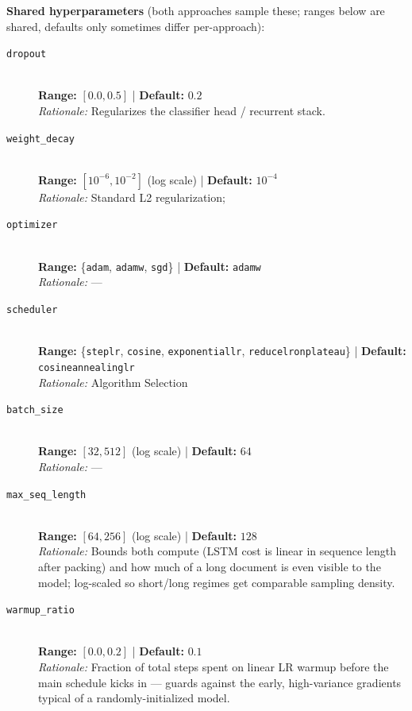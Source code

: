\documentclass[10pt]{article}
\begin{document}
\textbf{Shared hyperparameters} (both approaches sample these; ranges below are shared, defaults
only sometimes differ per-approach):

\begin{description}
    \item[\texttt{dropout}] \hfill \\
    \textbf{Range:} $[0.0, 0.5]$ \quad | \quad \textbf{Default:} $0.2$ \\
    \textit{Rationale:} Regularizes the classifier head / recurrent stack.

    \item[\texttt{weight\_decay}] \hfill \\
    \textbf{Range:} $[10^{-6}, 10^{-2}]$ (log scale) \quad | \quad \textbf{Default:} $10^{-4}$ \\
    \textit{Rationale:} Standard L2 regularization;

    \item[\texttt{optimizer}] \hfill \\
    \textbf{Range:} \{\texttt{adam}, \texttt{adamw}, \texttt{sgd}\} \quad | \quad \textbf{Default:} \texttt{adamw} \\
    \textit{Rationale:} ---

    \item[\texttt{scheduler}] \hfill \\
    \textbf{Range:} \{\texttt{steplr}, \texttt{cosine}, \texttt{exponentiallr}, \texttt{reducelronplateau}\} \quad | \quad \textbf{Default:} \texttt{cosineannealinglr} \\
    \textit{Rationale:} Algorithm Selection

    \item[\texttt{batch\_size}] \hfill \\
    \textbf{Range:} $[32, 512]$ (log scale) \quad | \quad \textbf{Default:} $64$ \\
    \textit{Rationale:} ---

    \item[\texttt{max\_seq\_length}] \hfill \\
    \textbf{Range:} $[64, 256]$ (log scale) \quad | \quad \textbf{Default:} $128$ \\
    \textit{Rationale:} Bounds both compute (LSTM cost is linear in sequence length after packing) and how much of a long document is even visible to the model; log-scaled so short/long regimes get comparable sampling density.

    \item[\texttt{warmup\_ratio}] \hfill \\
    \textbf{Range:} $[0.0, 0.2]$ \quad | \quad \textbf{Default:} $0.1$ \\
    \textit{Rationale:} Fraction of total steps spent on linear LR warmup before the main schedule kicks in --- guards against the early, high-variance gradients typical of a randomly-initialized model.
\end{description}
\end{document}
